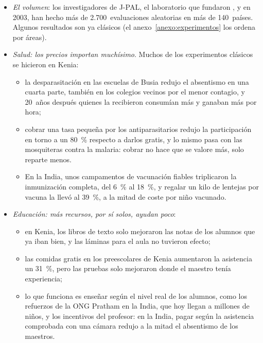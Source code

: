 \documentclass[11pt]{article}
\begin{document}
\begin{itemize}
\item \emph{El volumen}: los investigadores de J-PAL, el laboratorio que fundaron ,  y  en 2003, han hecho más de 2.700~evaluaciones aleatorias en más de 140~países\nocite{JPAL2026}. Algunos resultados son ya clásicos (el anexo~\ref{anexo:experimentos} los ordena por áreas).
\item \emph{Salud: los precios importan muchísimo}. Muchos de los experimentos clásicos se hicieron en Kenia:
  \begin{itemize}
  \item la desparasitación en las escuelas de Busia redujo el absentismo en una cuarta parte, también en los colegios vecinos por el menor contagio\nocite{MiguelKremer2004}, y 20~años después quienes la recibieron consumían más y ganaban más por hora\nocite{HamoryEtAl2021};
  \item cobrar una tasa pequeña por los antiparasitarios redujo la participación en torno a un 80~\% respecto a darlos gratis\nocite{KremerMiguel2007}, y lo mismo pasa con las mosquiteras contra la malaria\nocite{CohenDupas2010}: cobrar no hace que se valore más, solo reparte menos.
  \item En la India, unos campamentos de vacunación fiables triplicaron la inmunización completa, del 6~\% al 18~\%, y regalar un kilo de lentejas por vacuna la llevó al 39~\%, a la mitad de coste por niño vacunado\nocite{BanerjeeDufloGlennersterKothari2010}.
  \end{itemize}
\item \emph{Educación: más recursos, por sí solos, ayudan poco}:
  \begin{itemize}
  \item en Kenia, los libros de texto solo mejoraron las notas de los alumnos que ya iban bien\nocite{GlewweKremerMoulin2009}, y las láminas para el aula no tuvieron efecto\nocite{GlewweKremerMoulinZitzewitz2004};
  \item las comidas gratis en los preescolares de Kenia aumentaron la asistencia un 31~\%, pero las pruebas solo mejoraron donde el maestro tenía experiencia\nocite{VermeerschKremer2005};
  \item lo que funciona es enseñar según el nivel real de los alumnos, como los refuerzos de la ONG Pratham en la India\nocite{BanerjeeColeDufloLinden2007}, que hoy llegan a millones de niños\nocite{BanerjeeEtAl2017}, y los incentivos del profesor: en la India, pagar según la asistencia comprobada con una cámara redujo a la mitad el absentismo de los maestros\nocite{DufloHannaRyan2012}.

\end{itemize}
\end{itemize}
\end{document}
